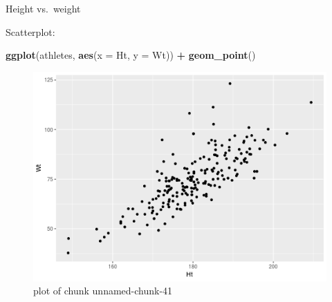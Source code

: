\documentclass[ignorenonframetext,]{beamer}
\newenvironment{Shaded}{\begin{snugshade}}{\end{snugshade}}
\newcommand{\DataTypeTok}[1]{\textcolor[rgb]{0.13,0.29,0.53}{#1}}
\newcommand{\KeywordTok}[1]{\textcolor[rgb]{0.13,0.29,0.53}{\textbf{#1}}}
\newcommand{\NormalTok}[1]{#1}
\newcommand{\OperatorTok}[1]{\textcolor[rgb]{0.81,0.36,0.00}{\textbf{#1}}}
\newcommand{\StringTok}[1]{\textcolor[rgb]{0.31,0.60,0.02}{#1}}
\begin{document}
\begin{frame}[fragile]{Height vs.~weight}
\protect\hypertarget{height-vs.weight}{}

Scatterplot:

\begin{Shaded}
\begin{Highlighting}[]
\KeywordTok{ggplot}\NormalTok{(athletes, }\KeywordTok{aes}\NormalTok{(}\DataTypeTok{x =}\NormalTok{ Ht, }\DataTypeTok{y =}\NormalTok{ Wt)) }\OperatorTok{+}\StringTok{ }\KeywordTok{geom_point}\NormalTok{()}
\end{Highlighting}
\end{Shaded}

\begin{figure}
\centering
\includegraphics{figure/unnamed-chunk-41-1.png}
\caption{plot of chunk unnamed-chunk-41}
\end{figure}

\end{frame}
\end{document}
